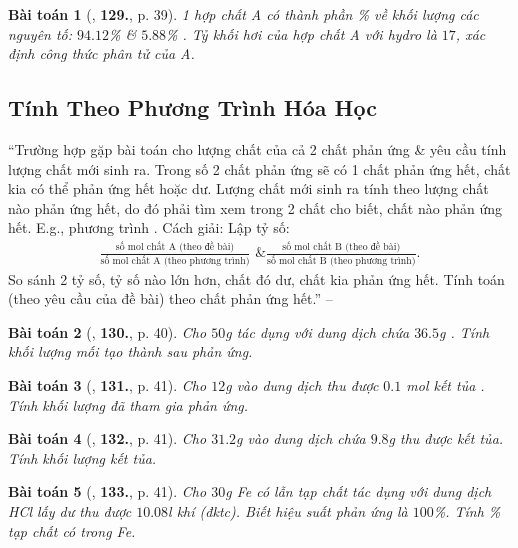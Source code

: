 \documentclass{article}
\numberwithin{equation}{section}
\newtheorem{baitoan}{Bài toán}[section]
\begin{document}
\begin{baitoan}[\cite{An2011}, \textbf{129.}, p. 39]
	1 hợp chất A có thành phần \% về khối lượng các nguyên tố: $94.12$\%  \& $5.88$\% . Tỷ khối hơi của hợp chất A với hydro là $17$, xác định công thức phân tử của A.
\end{baitoan}


\subsection{Tính Theo Phương Trình Hóa Học}
``Trường hợp gặp bài toán cho lượng chất của cả 2 chất phản ứng \& yêu cầu tính lượng chất mới sinh ra. Trong số 2 chất phản ứng sẽ có 1 chất phản ứng hết, chất kia có thể phản ứng hết hoặc dư. Lượng chất mới sinh ra tính theo lượng chất nào phản ứng hết, do đó phải tìm xem trong 2 chất cho biết, chất nào phản ứng hết. E.g., phương trình . Cách giải: Lập tỷ số:
\begin{align*}
	\frac{\mbox{số mol chất A (theo đề bài)}}{\mbox{số mol chất A (theo phương trình)}}\mbox{ \& }\frac{\mbox{số mol chất B (theo đề bài)}}{\mbox{số mol chất B (theo phương trình)}}.
\end{align*}
So sánh 2 tỷ số, tỷ số nào lớn hơn, chất đó dư, chất kia phản ứng hết. Tính toán (theo yêu cầu của đề bài) theo chất phản ứng hết.'' -- \cite[p. 40]{An2011}

\begin{baitoan}[\cite{An2011}, \textbf{130.}, p. 40]
	Cho $50$\emph{g} \emph{} tác dụng với dung dịch chứa $36.5$\emph{g} \emph{}. Tính khối lượng mối tạo thành sau phản ứng.
\end{baitoan}

\begin{baitoan}[\cite{An2011}, \textbf{131.}, p. 41]
	Cho $12$\emph{g} \emph{} vào dung dịch \emph{} thu được $0.1$ mol kết tủa \emph{}. Tính khối lượng \emph{} đã tham gia phản ứng.
\end{baitoan}

\begin{baitoan}[\cite{An2011}, \textbf{132.}, p. 41]
	Cho $31.2$\emph{g} \emph{} vào dung dịch \emph{} chứa $9.8$\emph{g} thu được \emph{} kết tủa. Tính khối lượng kết tủa.
\end{baitoan}

\begin{baitoan}[\cite{An2011}, \textbf{133.}, p. 41]
	Cho $30$\emph{g} \emph{Fe} có lẫn tạp chất tác dụng với dung dịch \emph{HCl} lấy dư thu được $10.08$\emph{l} khí \emph{} (đktc). Biết hiệu suất phản ứng là $100$\%. Tính \% tạp chất có trong \emph{Fe}.
\end{baitoan}
\end{document}
